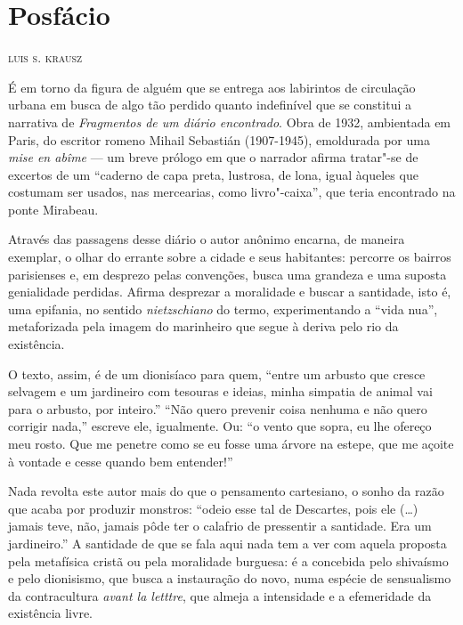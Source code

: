 
\small
\chapter*{Posfácio}

\hfill\textsc{luis s. krausz}

\bigskip

É em torno da figura de alguém que se entrega aos labirintos de
circulação urbana em busca de algo tão perdido quanto indefinível que se
constitui a narrativa de \emph{Fragmentos de um diário encontrado}. Obra
de 1932, ambientada em Paris, do escritor romeno Mihail Sebastián
(1907-1945), emoldurada por uma \emph{mise en abîme} --- um breve prólogo
em que o narrador afirma tratar"-se de excertos de um ``caderno de capa
preta, lustrosa, de lona, igual àqueles que costumam ser usados, nas mercearias, como livro"-caixa'', que teria encontrado na ponte Mirabeau.

Através das passagens desse diário o
autor anônimo encarna, de maneira exemplar, o olhar do errante sobre a
cidade e seus habitantes: percorre os bairros parisienses e, em desprezo
pelas convenções, busca uma grandeza e uma suposta genialidade perdidas.
Afirma desprezar a moralidade e buscar a santidade, isto é,
uma epifania, no sentido \emph{nietzschiano} do termo, experimentando
a ``vida nua'', metaforizada pela imagem do marinheiro que segue à deriva
pelo rio da existência.

O texto, assim, é de um dionisíaco para quem, ``entre um arbusto que
cresce selvagem e um jardineiro com tesouras e ideias, minha simpatia de
animal vai para o arbusto, por inteiro.'' ``Não quero prevenir coisa
nenhuma e não quero corrigir nada,'' escreve ele, igualmente. Ou: ``o
vento que sopra, eu lhe ofereço meu rosto. Que me penetre como se eu
fosse uma árvore na estepe, que me açoite à vontade e cesse quando bem
entender!''

Nada revolta este autor mais do que o pensamento cartesiano, o sonho da
razão que acaba por produzir monstros: ``odeio esse tal de Descartes,
pois ele (\ldots{}) jamais teve, não, jamais pôde ter o calafrio de
pressentir a santidade. Era um jardineiro.'' A santidade de que se fala
aqui nada tem a ver com aquela proposta pela metafísica cristã ou pela
moralidade burguesa: é a concebida pelo shivaísmo e pelo dionisismo, que
busca a instauração do novo, numa espécie de sensualismo da
contracultura \emph{avant la letttre}, que almeja a intensidade e a
efemeridade da existência livre.

